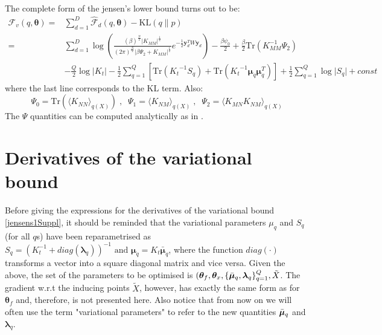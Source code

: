 \par
The complete form of the jensen's lower bound turns out to be:
\begin{align}
\mathcal{F}_v(q, \boldsymbol \theta) = {}& \sum_{d=1}^{D} 
	\hat{\mathcal{F}}_d(q, \boldsymbol \theta) -  \text{KL}(q \parallel p) \nonumber \\
	= {}& 
	\sum_{d=1}^{D} 
		\log \left( 
		\frac{(\beta)^{\frac{N}{2}} \vert \mathit{K_{MM}} \vert ^\frac{1}{2} }
			 {(2\pi)^{\frac{N}{2}} \vert \beta \Psi_2 + \mathit{K_{MM}}  \vert ^\frac{1}{2} } 	
		 e^{-\frac{1}{2} \mathbf{y}^{T}_{d} W \mathbf{y}_d} 
		 \right) -
		 \frac{\beta \psi_0}{2} + \frac{\beta}{2} 
		 \text{Tr} \left( \mathit{K_{MM}^{-1}} \Psi_2 \right)  \nonumber \\
{}&	- \frac{Q}{2} \log \vert \mathit{K_t} \vert - \frac{1}{2} \sum_{q=1}^{Q}
	  \left[ \text{Tr} \left( \mathit{K_t}^{-1} \mathit{S_q} \right)	  
	  	   + \text{Tr} \left( \mathit{K_t}^{-1} \boldsymbol \mu_q \boldsymbol \mu_q^T \right) \right] 
	 + \frac{1}{2} \sum_{q=1}^Q \log \vert \mathit{S_q} \vert + const  \label{boundFinal}
\end{align}
where the last line corresponds to the KL term. Also:
\begin{equation}
\label{psis}
\Psi_0 = \text{Tr}(\langle \mathit{K_{NN}} \rangle_{q(\mathit{X})}) \;, \;\;
\Psi_1 = \langle \mathit{K_{NM}} \rangle_{q(\mathit{X})} \;, \;\;
\Psi_2 = \langle \mathit{K_{MN}} \mathit{K_{NM}} \rangle_{q(\mathit{X})}
\end{equation}
The $\Psi$ quantities can be computed analytically as in \cite{BayesianGPLVM}.



\section{Derivatives of the variational bound}
Before giving the expressions for the derivatives of the variational bound \eqref{jensens1Suppl},
it should be reminded that the variational parameters $\mu_q$ and $S_q$ (for all $q$s) have been
reparametrised as $S_q = \left( \mathit{K}_t^{-1} + diag(\boldsymbol \lambda_q) \right)^{-1}  \text{ and }   \boldsymbol \mu_q = K_t \bar{\boldsymbol \mu}_q$, where the function $diag(\cdot)$ transforms a vector into a square diagonal matrix and vice versa. Given the above, the set of the parameters to be optimised is 
$( \boldsymbol \theta_f, \boldsymbol \theta_x, \{ \bar{\boldsymbol \mu}_q, \boldsymbol \lambda_q \}_{q=1}^Q, \tilde{X}$. The gradient w.r.t the inducing points $\tilde{X}$, however, has exactly the same form as for $\boldsymbol \theta_f$ and, therefore, is not presented here. Also notice that from now on we will often use the term "variational parameters" to refer to the new quantities $\bar{\boldsymbol \mu}_q$ and $\boldsymbol \lambda_q$. 

